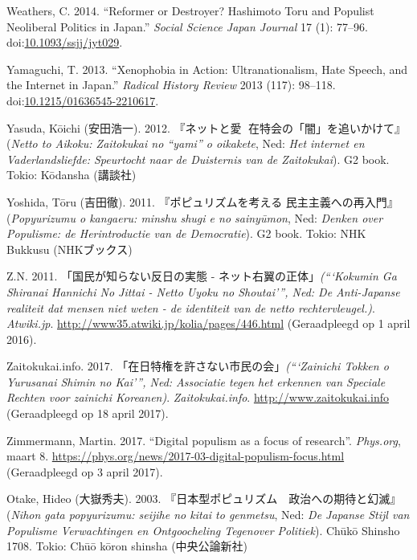 \documentclass[10.5pt,dutch,]{article}
\begin{document}
\hypertarget{ref-weathersux5freformerux5f2014}{}
Weathers, C. 2014. “Reformer or Destroyer? Hashimoto Toru and Populist
Neoliberal Politics in Japan.” \emph{Social Science Japan Journal} 17
(1): 77--96.
doi:\href{https://doi.org/10.1093/ssjj/jyt029}{10.1093/ssjj/jyt029}.

\hypertarget{ref-yamaguchiux5fxenophobiaux5f2013}{}
Yamaguchi, T. 2013. “Xenophobia in Action: Ultranationalism, Hate Speech,
and the Internet in Japan.” \emph{Radical History Review} 2013 (117):
98--118.
doi:\href{https://doi.org/10.1215/01636545-2210617}{10.1215/01636545-2210617}.

\hypertarget{ref-yasudaux5fnettoux5f2012}{}
Yasuda, Kōichi (安田浩一). 2012. 『ネットと愛国̶ 在特会の「闇」を追いかけて』(\emph{Netto to Aikoku: Zaitokukai
no “yami” o oikakete}, Ned: \emph{Het internet en Vaderlandsliefde: Speurtocht naar de Duisternis van de
Zaitokukai}). G2 book. Tokio: Kōdansha (講談社)

\hypertarget{ref-yoshidaux5fpopyurizumuux5f2011}{}
Yoshida, Tōru (吉田徹). 2011. 『ポピュリズムを考える 民主主義への再入門』(\emph{Popyurizumu o kangaeru: minshu shugi e no sainyūmon}, Ned: \emph{Denken over Populisme: de Herintroductie van de Democratie}). G2 book. Tokio: NHK Bukkusu (NHKブックス)

\hypertarget{ref-z.n.ux5fkokuminux5f2011}{}
Z.N. 2011. 「国民が知らない反日の実態 - ネット右翼の正体」\emph{(“‘Kokumin Ga Shiranai Hannichi No Jittai - Netto Uyoku no Shoutai’”, Ned:  De Anti-Japanse realiteit dat mensen niet weten - de identiteit van de netto rechtervleugel.)}. \emph{Atwiki.jp}. \url{http://www35.atwiki.jp/kolia/pages/446.html} (Geraadpleegd op 1 april 2016).

\hypertarget{ref-zaitokukai.infoux5fzaitokukaiux5f2017}{}
Zaitokukai.info. 2017. 「在日特権を許さない市民の会」\emph{(“‘Zainichi Tokken o Yurusanai Shimin no Kai’”, Ned:  Associatie tegen het erkennen van Speciale Rechten voor zainichi Koreanen)}. \emph{Zaitokukai.info}. \url{http://www.zaitokukai.info} (Geraadpleegd op 18 april 2017).

\hypertarget{ref-zimmermannux5fdigitalux5f2017}{}
Zimmermann, Martin. 2017. “Digital populism as a focus of research”. \emph{Phys.org}, maart 8. \url{https://phys.org/news/2017-03-digital-populism-focus.html} (Geraadpleegd op 3 april 2017).

\hypertarget{ref-otakeux5fnihonux5f2003}{}
Otake, Hideo (大嶽秀夫). 2003. 『日本型ポピュリズム　政治への期待と幻滅』(\emph{Nihon gata popyurizumu: seijihe no kitai to genmetsu}, Ned: \emph{ De Japanse Stijl van Populisme Verwachtingen en Ontgoocheling Tegenover Politiek}). Chūkō Shinsho 1708. Tokio: Chūō kōron shinsha (中央公論新社)
\end{document}
